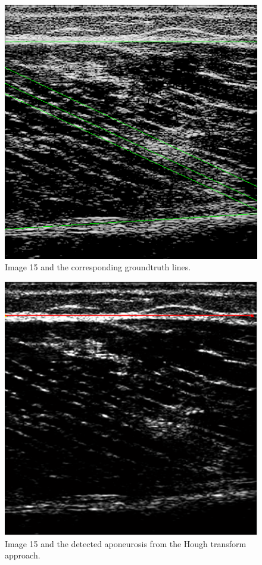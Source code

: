 \documentclass[10pt,twocolumn,letterpaper]{article}
\begin{document}
\begin{figure}
	\begin{center}		
		\includegraphics[width=1\linewidth]{img/im15_gt}
	\end{center}
	\caption{Image 15 and the corresponding groundtruth lines.}
	\label{fig:im15_gt}
	
\end{figure}

\begin{figure}
	\begin{center}		
		\includegraphics[width=1\linewidth]{img/im15_hough_apo}
	\end{center}
	\caption{Image 15 and the detected aponeurosis from the Hough transform approach.}
	\label{fig:im15_hough_apo}
	
\end{figure}
\end{document}
